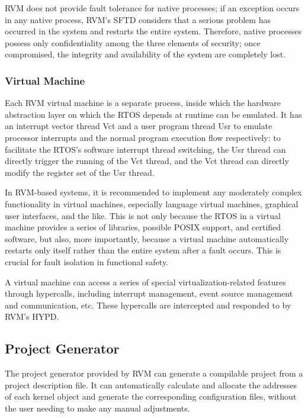 RVM does not provide fault tolerance for native processes; if an exception occurs in any native process, RVM's SFTD considers that a serious problem has occurred in the system and restarts the entire system. Therefore, native processes possess only confidentiality among the three elements of security; once compromised, the integrity and availability of the system are completely lost.

\subsubsection{Virtual Machine}\label{subsubsec:2-1-3-2}

Each RVM virtual machine is a separate process, inside which the hardware abstraction layer on which the RTOS depends at runtime can be emulated. It has an interrupt vector thread Vct and a user program thread Usr to emulate processor interrupts and the normal program execution flow respectively: to facilitate the RTOS's software interrupt thread switching, the Usr thread can directly trigger the running of the Vct thread, and the Vct thread can directly modify the register set of the Usr thread.

In RVM-based systems, it is recommended to implement any moderately complex functionality in virtual machines, especially language virtual machines, graphical user interfaces, and the like. This is not only because the RTOS in a virtual machine provides a series of libraries, possible POSIX support, and certified software, but also, more importantly, because a virtual machine automatically restarts only itself rather than the entire system after a fault occurs. This is crucial for fault isolation in functional safety.

A virtual machine can access a series of special virtualization-related features through hypercalls, including interrupt management, event source management and communication, etc. These hypercalls are intercepted and responded to by RVM's HYPD.

\subsection{Project Generator}\label{subsec:2-1-4}

The project generator provided by RVM can generate a compilable project from a project description file. It can automatically calculate and allocate the addresses of each kernel object and generate the corresponding configuration files, without the user needing to make any manual adjustments.

